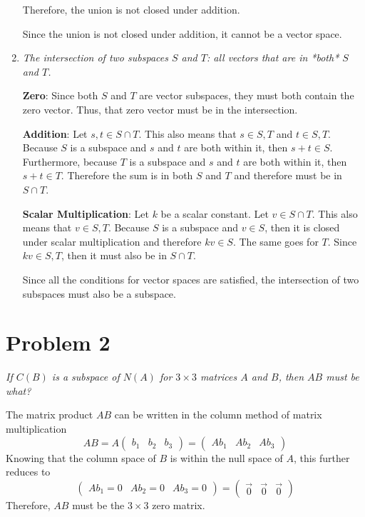 \documentclass{article}
\begin{document}
\begin{enumerate}
    Therefore, the union is not closed under addition.

    \bigbreak

    Since the union is not closed under addition, it cannot be a vector space.

    \item \textit{The intersection of two subspaces $S$ and $T$: all vectors
    that are in *both* $S$ and $T$.}

    \bigbreak

    {\bf Zero}: Since both $ S $ and $ T $ are vector subspaces, they must
    both contain the zero vector. Thus, that zero vector must be in the
    intersection.

    \bigbreak

    {\bf Addition}: Let $ s,t \in S \cap T $. This also means that $ s \in S,
    T $ and $ t \in S, T $. Because $ S $ is a subspace and $ s $ and $ t $
    are both within it, then $ s + t \in S $. Furthermore, because $ T $ is a
    subspace and $ s $ and $ t $ are both within it, then $ s + t \in T $.
    Therefore the sum is in both $ S $ and $ T $ and therefore must be in $ S
    \cap T $.

    \bigbreak

    {\bf Scalar Multiplication}: Let $ k $ be a scalar constant. Let $ v \in
    S \cap T $. This also means that $ v \in S, T $. Because $ S $ is a
    subspace and $ v \in S $, then it is closed under scalar multiplication
    and therefore $ kv \in S $. The same goes for $ T $. Since $ kv \in S, T
    $, then it must also be in $ S \cap T $.

    \bigbreak

    Since all the conditions for vector spaces are satisfied, the intersection
    of two subspaces must also be a subspace.

\end{enumerate}

\section*{Problem 2}

\textit{If $C(B)$ is a subspace of $N(A)$ for $3\times 3$ matrices $A$ and
$B$, then $AB$ must be what?}

\bigbreak

The matrix product $ AB $ can be written in the column method of matrix
multiplication
$$ AB = A \begin{pmatrix}
    b_1 & b_2 & b_3
\end{pmatrix} 
= \begin{pmatrix}
    A b_1 & A b_2 & A b_3
\end{pmatrix} $$
Knowing that the column space of $ B $ is within the null space of $ A $, this
further reduces to
$$ \begin{pmatrix}
    A b_1 = 0 & A b_2 = 0 & A b_3 = 0
\end{pmatrix}
=
\begin{pmatrix}
    \vec{0} & \vec{0} & \vec{0}
\end{pmatrix} $$
Therefore, $ AB $ must be the $ 3 \times 3 $ zero matrix.
\end{document}
